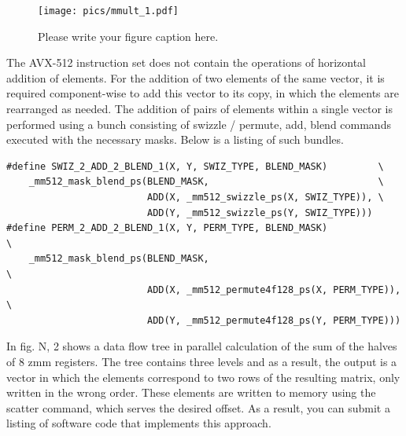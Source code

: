 \documentclass[
11pt,%
tightenlines,%
twoside,%
onecolumn,%
nofloats,%
nobibnotes,%
nofootinbib,%
superscriptaddress,%
noshowpacs,%
centertags]%
{revtex4}
\begin{document}
\begin{figure}[h]
\setcaptionmargin{5mm}
\onelinecaptionstrue  %
\texttt{[image: pics/mmult\_1.pdf]}
\caption{Please write your figure caption here.}\label{fig:1}
\end{figure}

The AVX-512 instruction set does not contain the operations of horizontal addition of elements. For the addition of two elements of the same vector, it is required component-wise to add this vector to its copy, in which the elements are rearranged as needed. The addition of pairs of elements within a single vector is performed using a bunch consisting of swizzle / permute, add, blend commands executed with the necessary masks. Below is a listing of such bundles.

\begin{lstlisting}
#define SWIZ_2_ADD_2_BLEND_1(X, Y, SWIZ_TYPE, BLEND_MASK)         \
    _mm512_mask_blend_ps(BLEND_MASK,                              \
                         ADD(X, _mm512_swizzle_ps(X, SWIZ_TYPE)), \
                         ADD(Y, _mm512_swizzle_ps(Y, SWIZ_TYPE)))
#define PERM_2_ADD_2_BLEND_1(X, Y, PERM_TYPE, BLEND_MASK)              \
    _mm512_mask_blend_ps(BLEND_MASK,                                   \
                         ADD(X, _mm512_permute4f128_ps(X, PERM_TYPE)), \
                         ADD(Y, _mm512_permute4f128_ps(Y, PERM_TYPE)))

\end{lstlisting}

In fig. N, 2 shows a data flow tree in parallel calculation of the sum of the halves of 8 zmm registers. The tree contains three levels and as a result, the output is a vector in which the elements correspond to two rows of the resulting matrix, only written in the wrong order. These elements are written to memory using the scatter command, which serves the desired offset. As a result, you can submit a listing of software code that implements this approach.
\end{document}
